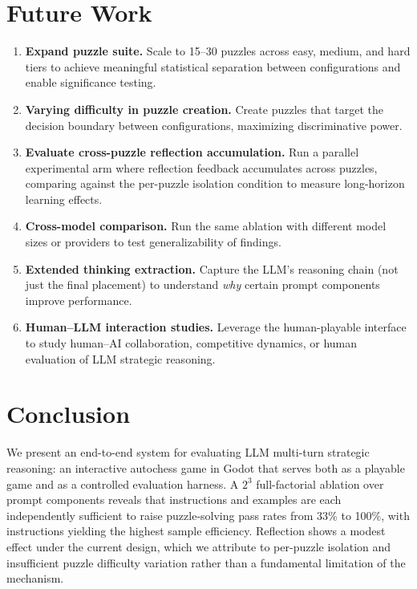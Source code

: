 \documentclass[11pt]{article}
\begin{document}
\section{Future Work}\label{sec:future}

\begin{enumerate}[nosep]
    \item \textbf{Expand puzzle suite.} Scale to 15--30 puzzles across easy, medium, and hard tiers to achieve meaningful statistical separation between configurations and enable significance testing.
    \item \textbf{Varying difficulty in puzzle creation.} Create puzzles that target the decision boundary between configurations, maximizing discriminative power.
    \item \textbf{Evaluate cross-puzzle reflection accumulation.} Run a parallel experimental arm where reflection feedback accumulates across puzzles, comparing against the per-puzzle isolation condition to measure long-horizon learning effects.
    \item \textbf{Cross-model comparison.} Run the same ablation with different model sizes or providers to test generalizability of findings.
    \item \textbf{Extended thinking extraction.} Capture the LLM's reasoning chain (not just the final placement) to understand \emph{why} certain prompt components improve performance.
    \item \textbf{Human--LLM interaction studies.} Leverage the human-playable interface to study human--AI collaboration, competitive dynamics, or human evaluation of LLM strategic reasoning.
\end{enumerate}

\section{Conclusion}\label{sec:conclusion}

We present an end-to-end system for evaluating LLM multi-turn strategic reasoning: an interactive autochess game in Godot that serves both as a playable game and as a controlled evaluation harness.
A $2^3$ full-factorial ablation over prompt components reveals that instructions and examples are each independently sufficient to raise puzzle-solving pass rates from 33\% to 100\%, with instructions yielding the highest sample efficiency.
Reflection shows a modest effect under the current design, which we attribute to per-puzzle isolation and insufficient puzzle difficulty variation rather than a fundamental limitation of the mechanism.
\end{document}
